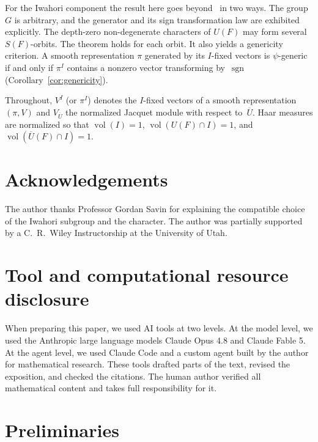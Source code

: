 \documentclass[11pt]{amsart}
\theoremstyle{definition}
\theoremstyle{remark}
\DeclareMathOperator{\sgn}{sgn}
\DeclareMathOperator{\vol}{vol}
\newcommand{\barr}[1]{\overline{#1}}
\begin{document}
For the Iwahori component the result here goes beyond~\cite{MP} in two ways. The group $G$ is arbitrary, and the generator and its sign transformation law are exhibited explicitly. The depth-zero non-degenerate characters of $U(F)$ may form several $S(F)$-orbits. The theorem holds for each orbit. It also yields a genericity criterion. A smooth representation $\pi$ generated by its $I$-fixed vectors is $\psi$-generic if and only if $\pi^I$ contains a nonzero vector transforming by~$\sgn$ (Corollary~\ref{cor:genericity}).

Throughout, $V^I$ (or $\pi^I$) denotes the $I$-fixed vectors of a smooth representation $(\pi,V)$ and $V_{\barr{U}}$ the normalized Jacquet module with respect to~$\barr{U}$. Haar measures are normalized so that $\vol(I) = 1$, $\vol(U(F)\cap I) = 1$, and $\vol(\barr{U}(F)\cap I) = 1$.


\section*{Acknowledgements}

The author thanks Professor Gordan Savin for explaining the compatible choice of the Iwahori subgroup and the character. The author was partially supported by a C.~R.~Wiley Instructorship at the University of Utah.

\section*{Tool and computational resource disclosure}

When preparing this paper, we used AI tools at two levels. At the model level, we used the Anthropic large language models Claude Opus 4.8 and Claude Fable 5. At the agent level, we used Claude Code and a custom agent built by the author for mathematical research. These tools drafted parts of the text, revised the exposition, and checked the citations. The human author verified all mathematical content and takes full responsibility for it.


\section{Preliminaries}\label{sec:prelim}
\end{document}
